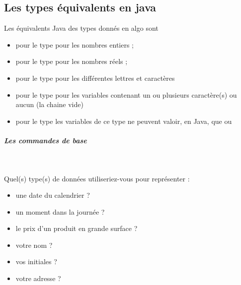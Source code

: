 \documentclass[11pt,a4paper]{article}
\begin{document}
				\subsection{Les types \'equivalents en java}
          Les \'equivalents Java des types donn\'es en algo sont
          
					\begin{itemize}
				
			\item \verb@int@ pour le type \verb@entier@ pour les nombres entiers ;
			\item \verb@double@ pour le type  pour les nombres r\'eels ;
			\item \verb@char@ pour le type  pour les diff\'erentes lettres et caract\`eres
			\item \verb@String@ pour le type \verb@chaine@ 
              pour les variables contenant un ou plusieurs caract\`ere(s) ou aucun (la chaine vide)
            
			\item \verb@boolean@ pour le type  les variables de ce type 
            ne peuvent valoir, en Java, que \verb@true@ ou \verb@false@
					\end{itemize}
				
            \par
        
			
		\subparagraph{Les commandes de base} 
		
                \textcolor{white}{.} \par
             
								Quel(s) type(s) de donn\'ees utiliseriez-vous pour repr\'esenter :
							
					\begin{itemize}
				
			\item une date du calendrier ?  \textcolor{gray}{\underline{\hspace*{10em}}} 
			\item un moment dans la journ\'ee ?  \textcolor{gray}{\underline{\hspace*{10em}}} 
			\item le prix d'un produit en grande surface ? \textcolor{gray}{\underline{\hspace*{5em}}} 
			\item votre nom ?  \textcolor{gray}{\underline{\hspace*{10em}}} 
			\item vos initiales ? \textcolor{gray}{\underline{\hspace*{10em}}} 
			\item votre adresse ?  \textcolor{gray}{\underline{\hspace*{10em}}} 
					\end{itemize}
\end{document}
